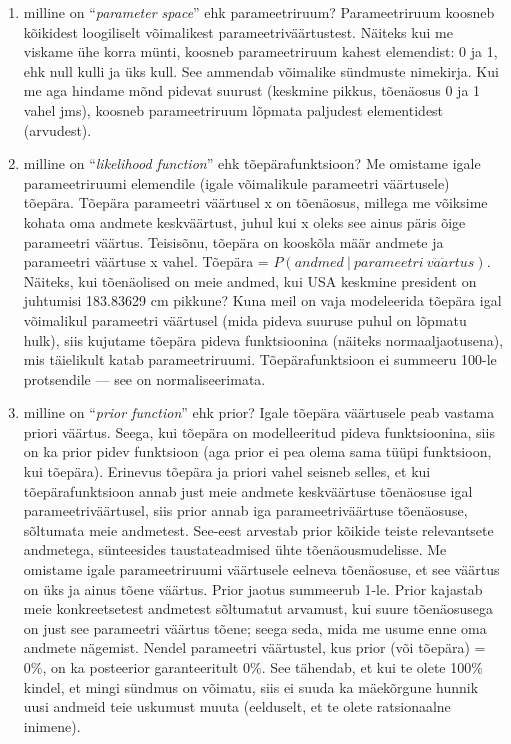 \documentclass[]{book}
\begin{document}
\begin{enumerate}
\def\labelenumi{\arabic{enumi})}
\item
  milline on ``\emph{parameter space}'' ehk parameetriruum? Parameetriruum koosneb kõikidest loogiliselt võimalikest parameetriväärtustest. Näiteks kui me viskame ühe korra münti, koosneb parameetriruum kahest elemendist: 0 ja 1, ehk null kulli ja üks kull. See ammendab võimalike sündmuste nimekirja. Kui me aga hindame mõnd pidevat suurust (keskmine pikkus, tõenäosus 0 ja 1 vahel jms), koosneb parameetriruum lõpmata paljudest elementidest (arvudest).
\item
  milline on ``\emph{likelihood function}'' ehk tõepärafunktsioon? Me omistame igale parameetriruumi elemendile (igale võimalikule parameetri väärtusele) tõepära. Tõepära parameetri väärtusel x on tõenäosus, millega me võiksime kohata oma andmete keskväärtust, juhul kui x oleks see ainus päris õige parameetri väärtus. Teisisõnu, tõepära on kooskõla määr andmete ja parameetri väärtuse x vahel. Tõepära = \(P(andmed~\vert~parameetri~v\ddot{a}\ddot{a}rtus)\). Näiteks, kui tõenäolised on meie andmed, kui USA keskmine president on juhtumisi 183.83629 cm pikkune? Kuna meil on vaja modeleerida tõepära igal võimalikul parameetri väärtusel (mida pideva suuruse puhul on lõpmatu hulk), siis kujutame tõepära pideva funktsioonina (näiteks normaaljaotusena), mis täielikult katab parameetriruumi. Tõepärafunktsioon ei summeeru 100-le protsendile --- see on normaliseerimata.
\item
  milline on ``\emph{prior function}'' ehk prior? Igale tõepära väärtusele peab vastama priori väärtus. Seega, kui tõepära on modelleeritud pideva funktsioonina, siis on ka prior pidev funktsioon (aga prior ei pea olema sama tüüpi funktsioon, kui tõepära). Erinevus tõepära ja priori vahel seisneb selles, et kui tõepärafunktsioon annab just meie andmete keskväärtuse tõenäosuse igal parameetriväärtusel, siis prior annab iga parameetriväärtuse tõenäosuse, sõltumata meie andmetest. See-eest arvestab prior kõikide teiste relevantsete andmetega, sünteesides taustateadmised ühte tõenäousmudelisse. Me omistame igale parameetriruumi väärtusele eelneva tõenäosuse, et see väärtus on üks ja ainus tõene väärtus. Prior jaotus summeerub 1-le. Prior kajastab meie konkreetsetest andmetest sõltumatut arvamust, kui suure tõenäosusega on just see parameetri väärtus tõene; seega seda, mida me usume enne oma andmete nägemist. Nendel parameetri väärtustel, kus prior (või tõepära) = 0\%, on ka posteerior garanteeritult 0\%. See tähendab, et kui te olete 100\% kindel, et mingi sündmus on võimatu, siis ei suuda ka mäekõrgune hunnik uusi andmeid teie uskumust muuta (eelduselt, et te olete ratsionaalne inimene).
\end{enumerate}
\end{document}
